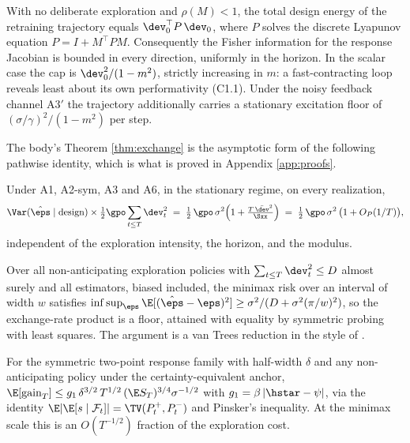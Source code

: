 \begin{theorem}
\label{thm:sat}
With no deliberate exploration and $\rho(M)<1$, the total design energy of
the retraining trajectory equals $\dev_0^\top P\,\dev_0$, where $P$ solves
the discrete Lyapunov equation $P = I + M^\top P M$. Consequently the Fisher
information for the response Jacobian is bounded in every direction,
uniformly in the horizon. In the scalar case the cap is
$\dev_0^2/(1-m^2)$, strictly increasing in $m$: a fast-contracting loop
reveals least about its own performativity (C1.1). Under the noisy feedback
channel A3$'$ the trajectory additionally carries a stationary excitation
floor of $(\sigma/\gamma)^2/(1-m^2)$ per step.
\end{theorem}

The body's Theorem \ref{thm:exchange} is the asymptotic form of the following
pathwise identity, which is what is proved in Appendix \ref{app:proofs}.

\begin{theorem}
\label{thm:t2exact}
Under A1, A2-sym, A3 and A6, in the stationary regime, on every realization,
\[
\Var(\hat\eps \mid \mathrm{design}) \times \tfrac{1}{2}\gpo \sum_{t\le T}
\dev_t^2 \;=\; \tfrac{1}{2}\,\gpo\,\sigma^2\Big(1 +
\tfrac{T\,\bar{\dev}^2}{\Sxx}\Big)
\;=\; \tfrac{1}{2}\,\gpo\,\sigma^2\,\big(1 + O_P(1/T)\big),
\]
independent of the exploration intensity, the horizon, and the modulus.
\end{theorem}

\begin{theorem}
\label{thm:t3}
Over all non-anticipating exploration policies with
$\sum_{t\le T} \dev_t^2 \le D$ almost surely and all estimators, biased
included, the minimax risk over an interval of width $w$ satisfies
$\inf \sup_{\eps} \E[(\hat\eps - \eps)^2] \ge \sigma^2/(D + \sigma^2
(\pi/w)^2)$, so the exchange-rate product is a floor, attained with equality
by symmetric probing with least squares. The argument is a van Trees
reduction in the style of \citet{gill1995applications}.
\end{theorem}

\begin{lemma}
\label{lem:l2}
For the symmetric two-point response family with half-width $\delta$ and any
non-anticipating policy under the certainty-equivalent anchor,
$\E[\mathrm{gain}_T] \le g_1\,\delta^{3/2}\,T^{1/2}\,(\E S_T)^{3/4}
\sigma^{-1/2}$ with $g_1 = \beta\,|\hstar - \psi|$, via the identity
$\E|\E[s\mid\mathcal{F}_t]| = \TV(P^+_t, P^-_t)$ and Pinsker's inequality.
At the minimax scale this is an $O(T^{-1/2})$ fraction of the exploration
cost.
\end{lemma}

